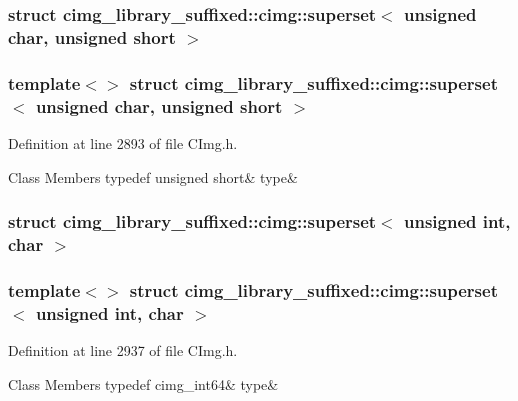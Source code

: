 \subsubsection{struct cimg\+\_\+library\+\_\+suffixed\+:\+:cimg\+:\+:superset$<$ unsigned char, unsigned short $>$}
\subsubsection*{template$<$$>$\newline
struct cimg\+\_\+library\+\_\+suffixed\+::cimg\+::superset$<$ unsigned char, unsigned short $>$}



Definition at line 2893 of file C\+Img.\+h.

\begin{DoxyFields}{Class Members}
\mbox{\label{namespacecimg__library__suffixed_1_1cimg_af2202f75978a321ae6c5220f4303d41f}} 
typedef unsigned short&
type&
\\
\hline

\end{DoxyFields}
\label{structcimg__library__suffixed_1_1cimg_1_1superset_3_01unsigned_01int_00_01char_01_4}
\subsubsection{struct cimg\+\_\+library\+\_\+suffixed\+:\+:cimg\+:\+:superset$<$ unsigned int, char $>$}
\subsubsection*{template$<$$>$\newline
struct cimg\+\_\+library\+\_\+suffixed\+::cimg\+::superset$<$ unsigned int, char $>$}



Definition at line 2937 of file C\+Img.\+h.

\begin{DoxyFields}{Class Members}
\mbox{\label{namespacecimg__library__suffixed_1_1cimg_a12c0e13f3654cd25a8f6e7204ed84791}} 
typedef cimg\_int64&
type&
\\
\hline

\end{DoxyFields}
\label{structcimg__library__suffixed_1_1cimg_1_1superset_3_01unsigned_01int_00_01cimg__int64_01_4}
